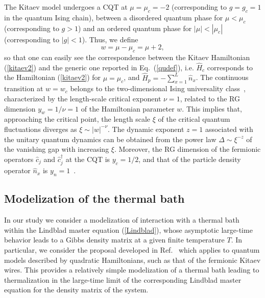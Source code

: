 The Kitaev model undergoes a CQT at $\mu=\mu_c = -2$ (corresponding to
$g=g_c=1$ in the quantum Ising chain), between a disordered quantum
phase for $\mu<\mu_c$ (corresponding to $g>1$) and an ordered quantum
phase for $|\mu|<|\mu_c|$ (corresponding to $|g|<1$). Thus, we define
\begin{equation}
  w = \mu - \mu_c = \mu + 2,
  \label{wdef}
\end{equation}
so that one can easily see the correspondence between the Kitaev
Hamiltonian (\ref{kitaev2}) and the generic one reported in
Eq.~(\ref{qudef}), i.e. $\hat{H}_c$ corresponds to the Hamiltonian
(\ref{kitaev2}) for $\mu=\mu_c$, and $\hat{H}_p=-\sum_{x=1}^L \hat
n_x$.  The continuous transition at $w=w_c$ belongs to the
two-dimensional Ising universality class~\cite{Sachdev-book,RV-21},
characterized by the length-scale critical exponent $\nu=1$, related
to the RG dimension $y_w = 1/\nu=1$ of the Hamiltonian parameter
$w$. This implies that, approaching the critical point, the length
scale $\xi$ of the critical quantum fluctuations diverges as $\xi \sim
|w|^{-\nu}$. The dynamic exponent $z=1$ associated with the unitary
quantum dynamics can be obtained from the power law
$\Delta\sim\xi^{-z}$ of the vanishing gap with increasing $\xi$.
Moreover, the RG dimension of the fermionic operators $\hat c_j$ and
$\hat c^\dagger_j$ at the CQT is $y_c = 1/2$, and that of the particle
density operator $\hat n_x$ is $y_n = 1$~\cite{Sachdev-book,RV-21}.


\subsection{Modelization of the thermal bath}
\label{thebath}

In our study we consider a modelization of interaction with a thermal
bath within the Lindblad master equation (\ref{Lindblad}), whose
asymptotic large-time behavior leads to a Gibbs density matrix at a
given finite temperature $T$. In particular, we consider the proposal
developed in Ref.~\cite{DR-21} which applies to quantum models
described by quadratic Hamiltonians, such as that of the fermionic
Kitaev wires. This provides a relatively simple modelization of a
thermal bath leading to thermalization in the large-time limit of the
corresponding Lindblad master equation for the density matrix of the
system.


